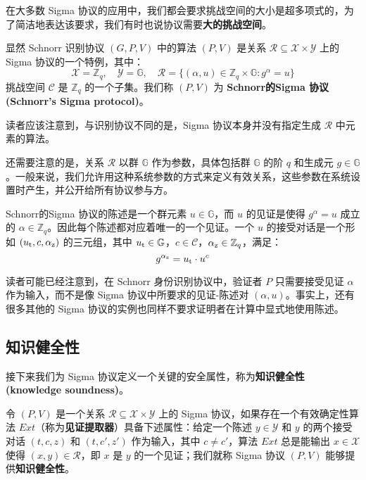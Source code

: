 在大多数 Sigma 协议的应用中，我们都会要求挑战空间的大小是超多项式的，为了简洁地表达该要求，我们有时也说协议需要\textbf{大的挑战空间}。

\begin{example}\label{exmp:19-1}
显然 Schnorr 识别协议 $(G,P,V)$ 中的算法 $(P,V)$ 是关系 $\mathcal{R}\subseteq\mathcal{X}×\mathcal{Y}$ 上的 Sigma 协议的一个特例，其中：
\[
\mathcal{X}=\mathbb{Z}_q,
\quad
\mathcal{Y}=\mathbb{G},
\quad
\mathcal{R}=\{(\alpha,u)\in\mathbb{Z}_q\times\mathbb{G}:g^\alpha=u\}
\]
挑战空间 $\mathcal{C}$ 是 $\mathbb{Z}_q$ 的一个子集。我们称 $(P,V)$ 为 \textbf{Schnorr的Sigma 协议 (Schnorr's Sigma protocol)}。

读者应该注意到，与识别协议不同的是，Sigma 协议本身并没有指定生成 $\mathcal{R}$ 中元素的算法。

还需要注意的是，关系 $\mathcal{R}$ 以群 $\mathbb{G}$ 作为参数，具体包括群 $\mathbb{G}$ 的阶 $q$ 和生成元 $g\in\mathbb{G}$。一般来说，我们允许用这种系统参数的方式来定义有效关系，这些参数在系统设置时产生，并公开给所有协议参与方。

Schnorr的Sigma 协议的陈述是一个群元素 $u\in\mathbb{G}$，而 $u$ 的见证是使得 $g^\alpha=u$ 成立的 $\alpha\in\mathbb{Z}_q$。因此每个陈述都对应着唯一的一个见证。一个 $u$ 的接受对话是一个形如 $(u_{\rm t},c,\alpha_{\rm z})$ 的三元组，其中 $u_{\rm t}\in\mathbb{G}$，$c\in\mathcal{C}$，$\alpha_{\rm z}\in\mathbb{Z}_q$，满足：
\[
g^{\alpha_{\rm z}}=u_{\rm t}\cdot u^c
\]

读者可能已经注意到，在 Schnorr 身份识别协议中，验证者 $P$ 只需要接受见证 $\alpha$ 作为输入，而不是像 Sigma 协议中所要求的见证-陈述对 $(\alpha,u)$。事实上，还有很多其他的 Sigma 协议的实例也同样不要求证明者在计算中显式地使用陈述。
\end{example}

\subsection{知识健全性}

接下来我们为 Sigma 协议定义一个关键的安全属性，称为\textbf{知识健全性 (knowledge soundness)}。

\begin{definition}[知识健全性]
令 $(P,V)$ 是一个关系 $\mathcal{R}\subseteq\mathcal{X}×\mathcal{Y}$ 上的 Sigma 协议，如果存在一个有效确定性算法 ${Ext}$（称为\textbf{见证提取器}）具备下述属性：给定一个陈述 $y\in\mathcal{Y}$ 和 $y$ 的两个接受对话 $(t,c,z)$ 和 $(t,c',z')$ 作为输入，其中 $c\neq c'$，算法 ${Ext}$ 总是能输出 $x\in\mathcal{X}$ 使得 $(x,y)\in\mathcal{R}$，即 $x$ 是 $y$ 的一个见证；我们就称 Sigma 协议 $(P,V)$ 能够提供\textbf{知识健全性}。
\end{definition}

